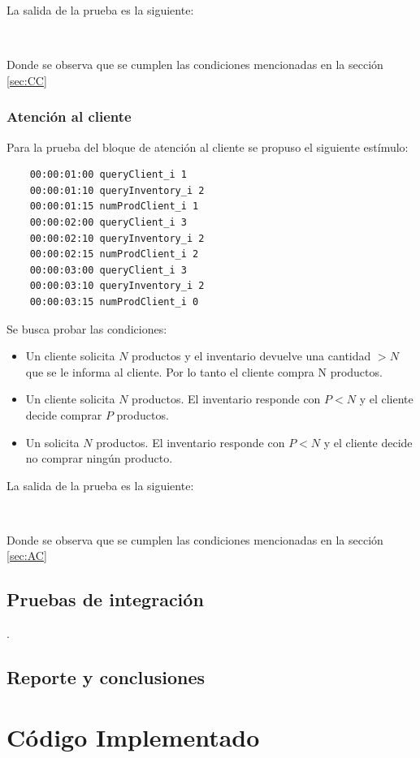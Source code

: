 \documentclass[10pt]{article}
\begin{document}
La salida de la prueba es la siguiente:

\begin{minipage}{1\textwidth}
	\centering
	\begin{lstlisting}
	
	\end{lstlisting}
	
\end{minipage}
Donde se observa que se cumplen las condiciones mencionadas en la sección \ref{sec:CC}

\subsubsection{Atención al cliente}
Para la prueba del bloque de atención al cliente se propuso el siguiente estímulo:

\begin{minipage}{1\textwidth}
	\centering
	\begin{lstlisting}
	00:00:01:00	queryClient_i 1
	00:00:01:10 queryInventory_i 2
	00:00:01:15 numProdClient_i 1
	00:00:02:00	queryClient_i 3
	00:00:02:10 queryInventory_i 2
	00:00:02:15 numProdClient_i 2
	00:00:03:00	queryClient_i 3
	00:00:03:10 queryInventory_i 2
	00:00:03:15 numProdClient_i 0
	\end{lstlisting}
	
\end{minipage}

Se busca probar las condiciones:
\begin{itemize}
	\item Un cliente solicita $N$ productos y el inventario devuelve una cantidad $> N$ que se le informa al cliente. Por lo tanto el cliente compra N productos.
	\item Un cliente solicita $N$ productos. El inventario responde con $P < N$ y el cliente decide comprar $P$ productos.
	\item Un solicita $N$ productos. El inventario responde con $P < N$ y el cliente decide no comprar ningún producto.
\end{itemize}

La salida de la prueba es la siguiente:

\begin{minipage}{1\textwidth}
	\centering
	\begin{lstlisting}
	
	\end{lstlisting}
	
\end{minipage}
Donde se observa que se cumplen las condiciones mencionadas en la sección \ref{sec:AC}

\subsection{Pruebas de integración}
.
\subsection{Reporte y conclusiones}


\appendix
\section{Código Implementado}



\end{document}
